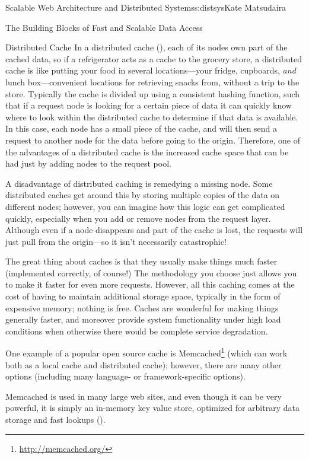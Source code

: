 \begin{aosachapter}{Scalable Web Architecture and Distributed Systems}{s:distsys}{Kate Matsudaira}
\begin{aosasect1}{The Building Blocks of Fast and Scalable Data Access}
\begin{aosasect2}{Distributed Cache}
In a distributed cache (), each of its nodes 
own part of the cached data,
so if a refrigerator acts as a cache to the grocery store, a
distributed cache is like putting your food in several locations---your
fridge, cupboards, \emph{and} lunch box---convenient locations for
retrieving snacks from, without a trip to the store. Typically the cache is divided up
using a consistent hashing function, such that if a request node is
looking for a certain piece of data it can quickly know where to look
within the distributed cache to determine if that data is
available. In this case, each node has a small piece of the cache, and
will then send a request to another node for the data before going to
the origin. Therefore, one of the advantages of a distributed cache is
the increased cache space that can be had just by adding 
nodes to the request pool.

A disadvantage of distributed caching is remedying a missing
node. Some distributed caches get around this by storing multiple
copies of the data on different nodes; however, you can imagine how
this logic can get complicated quickly, especially when you add or
remove nodes from the request layer. Although even if a node
disappears and part of the cache is lost, the requests will just pull
from the origin---so it isn't necessarily catastrophic!


The great thing about caches is that they usually make things much
faster (implemented correctly, of course!) The methodology you choose
just allows you to make it faster for even more requests. However, all
this caching comes at the cost of having to maintain additional
storage space, typically in the form of expensive memory; nothing is
free. Caches are wonderful for making things generally faster, and
moreover provide system functionality under high load conditions when
otherwise there would be complete service degradation.

One example of a popular open source cache is
Memcached\footnote{\url{http://memcached.org/}} (which can work both
as a local cache and distributed cache); however, there are many other
options (including many language- or framework-specific options).

Memcached is used in many large web sites, and even though it can be
very powerful, it is simply an in-memory key value store, optimized
for arbitrary data storage and fast lookups ().


\end{aosasect2}
\end{aosasect1}
\end{aosachapter}
